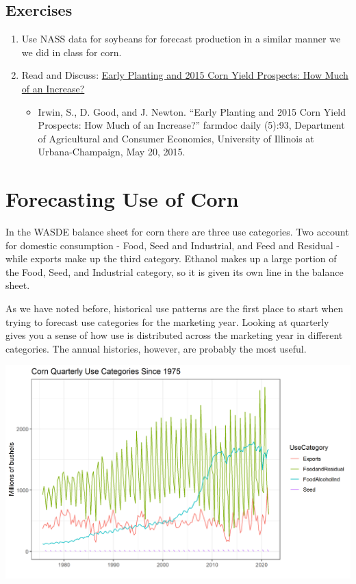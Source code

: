 \documentclass[
]{book}
\providecommand{\tightlist}{%
  \setlength{\itemsep}{0pt}\setlength{\parskip}{0pt}}
\begin{document}
\hypertarget{exercises-3}{%
\section{Exercises}\label{exercises-3}}

\begin{enumerate}
\def\labelenumi{\arabic{enumi}.}
\item
  Use NASS data for soybeans for forecast production in a similar manner we we did in class for corn.
\item
  Read and Discuss: \href{http://farmdocdaily.illinois.edu/2015/05/early-planting-and-2015-corn-yield-prospects.html}{Early Planting and 2015 Corn Yield Prospects: How Much of an Increase?}

  \begin{itemize}
  \tightlist
  \item
    Irwin, S., D. Good, and J. Newton. ``Early Planting and 2015 Corn Yield Prospects: How Much of an Increase?'' farmdoc daily (5):93, Department of Agricultural and Consumer Economics, University of Illinois at Urbana-Champaign, May 20, 2015.
  \end{itemize}
\end{enumerate}

\hypertarget{forecasting-use-of-corn}{%
\chapter{Forecasting Use of Corn}\label{forecasting-use-of-corn}}

In the WASDE balance sheet for corn there are three use categories. Two
account for domestic consumption - Food, Seed and Industrial, and Feed
and Residual - while exports make up the third category. Ethanol makes
up a large portion of the Food, Seed, and Industrial category, so it is
given its own line in the balance sheet.

As we have noted before, historical use patterns are the first place to
start when trying to forecast use categories for the marketing year.
Looking at quarterly gives you a sense of how use is distributed across
the marketing year in different categories. The annual histories,
however, are probably the most useful.

\includegraphics{assets/ForecastingUseof-CornUseCategories.png}
\end{document}
